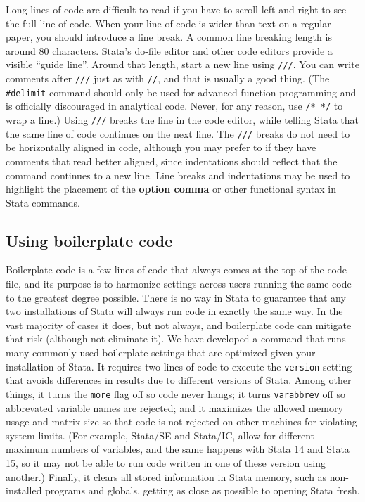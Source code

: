 Long lines of code are difficult to read if you have to scroll left and right to see the full line of code.
When your line of code is wider than text on a regular paper, you should introduce a line break.
A common line breaking length is around 80 characters.
Stata's do-file editor and other code editors provide a visible ``guide line''.
Around that length, start a new line using \texttt{///}.
You can write comments after \texttt{///} just as with \texttt{//}, and that is usually a good thing.
(The \texttt{\#delimit} command should only be used for advanced function programming
and is officially discouraged in analytical code.\cite{cox2005styleguide}
Never, for any reason, use \texttt{/* */} to wrap a line.)
Using \texttt{///} breaks the line in the code editor,
while telling Stata that the same line of code continues on the next line.
The \texttt{///} breaks do not need to be horizontally aligned in code,
although you may prefer to if they have comments that read better aligned,
since indentations should reflect that the command continues to a new line.
Line breaks and indentations may be used to highlight the placement
of the \textbf{option comma} or other functional syntax in Stata commands.


\subsection{Using boilerplate code}

Boilerplate code is a few lines of code that always comes at the top of the code file,
and its purpose is to harmonize settings across users running the same code to the greatest degree possible. There is no way in Stata to guarantee that any two installations of Stata
will always run code in exactly the same way.
In the vast majority of cases it does, but not always,
and boilerplate code can mitigate that risk (although not eliminate it).
We have developed a command that runs many commonly used boilerplate settings
that are optimized given your installation of Stata.
It requires two lines of code to execute the \texttt{version}
setting that avoids differences in results due to different versions of Stata.
Among other things, it turns the \texttt{more} flag off so code never hangs;
it turns \texttt{varabbrev} off so abbrevated variable names are rejected;
and it maximizes the allowed memory usage and matrix size
so that code is not rejected on other machines for violating system limits.
(For example, Stata/SE and Stata/IC, allow for different maximum numbers of variables,
and the same happens with Stata 14 and Stata 15,
so it may not be able to run code written in one of these version using another.)
Finally, it clears all stored information in Stata memory,
such as non-installed programs and globals,
getting as close as possible to opening Stata fresh.

